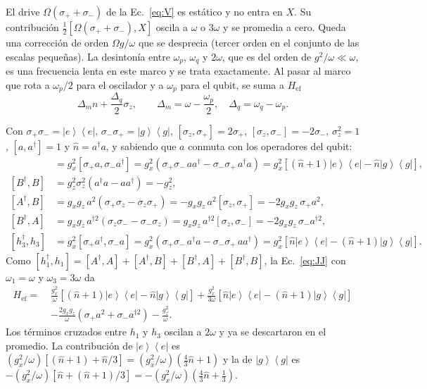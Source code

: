 \documentclass[11pt,a4paper]{article}
\newcommand{\ket}[1]{\left|#1\right\rangle}
\newcommand{\bra}[1]{\left\langle#1\right|}
\newcommand{\spl}{\sigma_{+}}
\newcommand{\smi}{\sigma_{-}}
\newcommand{\Pe}{\ket{e}\!\bra{e}}
\newcommand{\Pg}{\ket{g}\!\bra{g}}
\newcommand{\hn}{\hat n}
\newcommand{\Href}{H_{\mathrm{ef}}}
\theoremstyle{definition}
\begin{document}
El drive $\Omega(\spl+\smi)$ de la Ec.~\eqref{eq:V} es estático y no entra en $X$. Su contribución $\tfrac12[\Omega(\spl+\smi),X]$ oscila a $\omega$ o $3\omega$ y se promedia a cero. Queda una corrección de orden $\Omega g/\omega$ que se desprecia (tercer orden en el conjunto de las escalas pequeñas). La desintonía entre $\omega_p$, $\omega_q$ y $2\omega$, que es del orden de $g^2/\omega\ll\omega$, es una frecuencia lenta en este marco y se trata exactamente. Al pasar al marco que rota a $\omega_p/2$ para el oscilador y a $\omega_p$ para el qubit, se suma a $\Href$
\begin{equation}
\Delta_mn+\frac{\Delta_q}{2}\sigma_z,\qquad \Delta_m=\omega-\frac{\omega_p}{2},\quad\Delta_q=\omega_q-\omega_p.
\label{eq:desint}
\end{equation}


Con $\spl\smi=\Pe$, $\smi\spl=\Pg$, $[\sigma_z,\spl]=2\spl$, $[\sigma_z,\smi]=-2\smi$, $\sigma_z^2=1$, $[a,a^{\dagger}]=1$ y $\hn=a^{\dagger}a$, y sabiendo que $a$ conmuta con los operadores del qubit:
\begin{align}
[A^{\dagger},A]&=g_x^2[\spl a,\smi a^{\dagger}]=g_x^2\left(\spl\smi\,aa^{\dagger}-\smi\spl\,a^{\dagger}a\right)=g_x^2\left[(\hn+1)\Pe-\hn\Pg\right],\label{eq:c1}\\
[B^{\dagger},B]&=g_z^2\sigma_z^2\left(a^{\dagger}a-aa^{\dagger}\right)=-g_z^2,\label{eq:c2}\\
[A^{\dagger},B]&=g_xg_z\,a^2\left(\spl\sigma_z-\sigma_z\spl\right)=-g_xg_z\,a^2[\sigma_z,\spl]=-2g_xg_z\,\spl a^2,\label{eq:c3}\\
[B^{\dagger},A]&=g_xg_z\,a^{\dagger2}\left(\sigma_z\smi-\smi\sigma_z\right)=g_xg_z\,a^{\dagger2}[\sigma_z,\smi]=-2g_xg_z\,\smi a^{\dagger2},\label{eq:c4}\\
[h_3^{\dagger},h_3]&=g_x^2[\spl a^{\dagger},\smi a]=g_x^2\left(\spl\smi\,a^{\dagger}a-\smi\spl\,aa^{\dagger}\right)=g_x^2\left[\hn\Pe-(\hn+1)\Pg\right].\label{eq:c5}
\end{align}
Como $[h_1^{\dagger},h_1]=[A^{\dagger},A]+[A^{\dagger},B]+[B^{\dagger},A]+[B^{\dagger},B]$, la Ec.~\eqref{eq:JJ} con $\omega_1=\omega$ y $\omega_3=3\omega$ da
\begin{align}
\Href=\;&\frac{g_x^2}{\omega}\left[(\hn+1)\Pe-\hn\Pg\right]+\frac{g_x^2}{3\omega}\left[\hn\Pe-(\hn+1)\Pg\right]\nonumber\\
&-\frac{2g_xg_z}{\omega}\left(\spl a^2+\smi a^{\dagger2}\right)-\frac{g_z^2}{\omega}.
\end{align}
Los términos cruzados entre $h_1$ y $h_3$ oscilan a $2\omega$ y ya se descartaron en el promedio. La contribución de $\Pe$ es $(g_x^2/\omega)[(\hn+1)+\hn/3]=(g_x^2/\omega)(\tfrac43\hn+1)$ y la de $\Pg$ es $-(g_x^2/\omega)[\hn+(\hn+1)/3]=-(g_x^2/\omega)(\tfrac43\hn+\tfrac13)$.
\end{document}
